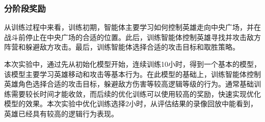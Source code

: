 \subsubsection{分阶段奖励}
从训练过程中来看，训练初期，智能体主要学习如何控制英雄走向中央广场，并在战斗前停止在中央广场的合适的位置。此后，训练智能体控制英雄寻找并攻击敌方阵营和躲避敌方攻击。最后，训练智能体选择合适的攻击目标和取胜策略。

本次实验中，通过先从初始化模型开始，连续训练10小时，得到一个基本的模型，该模型主要学习英雄移动和攻击等基本行为。在此模型的基础上，训练智能体控制英雄角色选择合适的攻击目标，躲避敌方伤害等较高逻辑等级的行为。通常基础训练需要较长时间才能收敛，而后续的优化训练可以使用较高的奖励，快速实现优化模型的效果。本次实验中优化训练选择2小时，从评估结果的录像回放中能看到，英雄已经具有较高的逻辑行为表现。